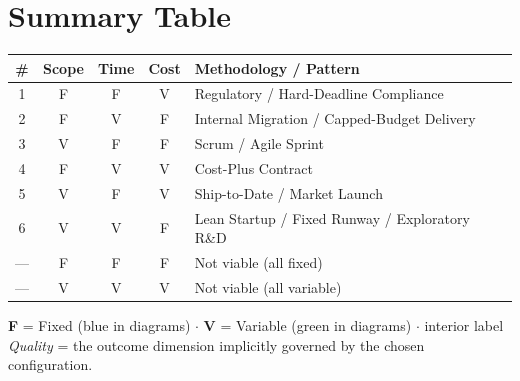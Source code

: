 \documentclass[11pt,a4paper]{article}
\begin{document}
\section{Summary Table}
\label{sec:summary}

\begin{center}
\begin{tabular}{c c c c l}
\toprule
\# & Scope & Time & Cost & Methodology / Pattern \\
\midrule
1 & F           & F           & V           & Regulatory / Hard-Deadline Compliance \\
2 & F           & V           & F           & Internal Migration / Capped-Budget Delivery \\
3 & V           & F           & F           & Scrum / Agile Sprint \\
4 & F           & V           & V           & Cost-Plus Contract \\
5 & V           & F           & V           & Ship-to-Date / Market Launch \\
6 & V           & V           & F           & Lean Startup / Fixed Runway / Exploratory R\&D \\
\midrule
--- & F & F & F & {\color{red!70!black}Not viable} (all fixed) \\
--- & V & V & V & {\color{red!70!black}Not viable} (all variable) \\
\bottomrule
\end{tabular}
\end{center}

\medskip
\noindent\textbf{F} = Fixed (blue in diagrams) $\cdot$ \textbf{V} =
Variable (green in diagrams) $\cdot$ interior label \emph{Quality} =
the outcome dimension implicitly governed by the chosen configuration.
\end{document}
